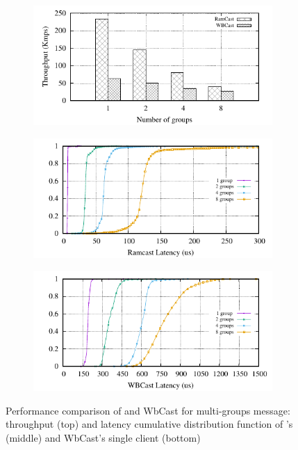 \begin{figure}[htp!]
  \begin{subfigure}{\columnwidth}
    \centering
    \includegraphics[width=0.99\columnwidth]{figures/benchmark/graphs/figure-multi-dest-compare-throughput}
  \end{subfigure}
  \begin{subfigure}{\columnwidth}
    \centering
    \includegraphics[width=0.95\columnwidth]{figures/benchmark/graphs/figure-multi-dest-compare-latency-cdf-ramcast}
  \end{subfigure}
  \begin{subfigure}{\columnwidth}
    \centering
    \includegraphics[width=0.95\columnwidth]{figures/benchmark/graphs/figure-multi-dest-compare-latency-cdf-wbcast}
  \end{subfigure}
  \caption{Performance comparison of \libname and WbCast for multi-groups message: throughput (top) and latency cumulative distribution function of \libname's (middle) and WbCast's single client (bottom)}
  \label{fig:multicast-multi-group}
\end{figure}
